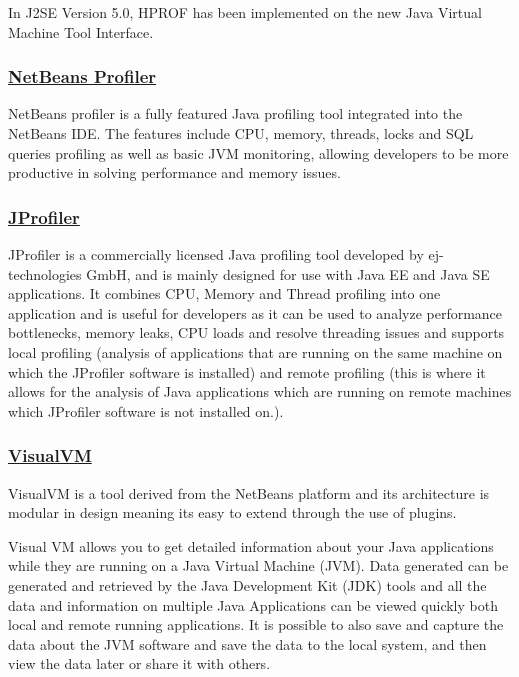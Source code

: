 In J2SE Version 5.0, HPROF has been implemented on the new Java Virtual Machine Tool Interface. 


\subsubsection{\href{https://profiler.netbeans.org/}{NetBeans Profiler}}

NetBeans profiler is a fully featured Java profiling tool integrated into the NetBeans IDE. The features include CPU, memory, threads, locks and SQL queries profiling as well as basic JVM monitoring, allowing developers to be more productive in solving performance and memory issues.


\subsubsection{\href{https://www.ej-technologies.com/products/jprofiler/overview.html}{JProfiler}}

JProfiler is a commercially licensed Java profiling tool developed by ej-technologies GmbH, and is mainly designed for use with Java EE and Java SE applications.
It combines CPU, Memory and Thread profiling into one application and is useful for developers as it can be used to analyze performance bottlenecks, memory leaks, CPU loads  and resolve threading issues and supports local profiling (analysis of applications that are running on the same machine on which the JProfiler software is installed) and remote profiling (this is where it allows for the analysis of Java applications which are running on remote machines which JProfiler software is not installed on.).


\subsubsection{\href{http://visualvm.github.io/}{VisualVM}}


VisualVM is a tool derived from the NetBeans platform and its architecture is modular in design meaning its easy to extend through the use of plugins.

Visual VM allows you to get detailed information about your Java applications while they are running on a Java Virtual Machine (JVM). Data generated can be generated and retrieved by the Java Development Kit (JDK) tools and all the data and information on multiple Java Applications can be viewed quickly both local and remote running applications.  It is possible to also save and capture the data about the JVM software and save the data to the local system, and then view the data later or share it with others.


